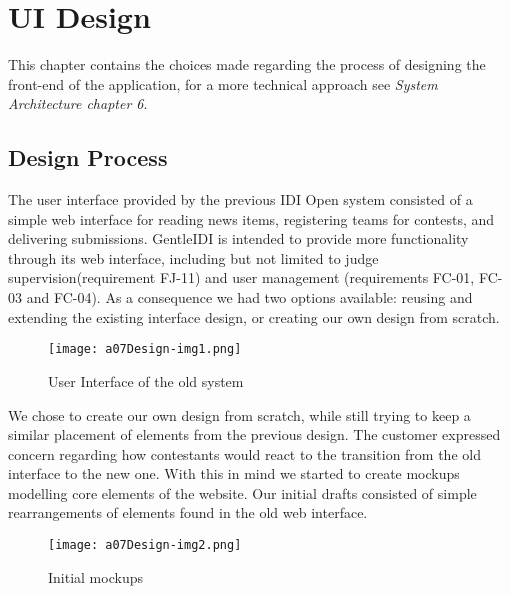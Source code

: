 \chapter{UI Design}
This chapter contains the choices made regarding the process of
designing the front-end of the application, for a more technical
approach see \textit{System Architecture chapter 6}.

\section{Design Process}
\label{sec:designProcess}

The user interface provided by the previous IDI Open system consisted of
a simple web interface for reading news items, registering teams for
contests, and delivering submissions. GentleIDI is intended to provide
more functionality through its web interface, including but not limited
to judge supervision(requirement FJ-11) and user management 
(requirements FC-01, FC-03 and FC-04). As a consequence
we had two options available: reusing and extending the existing
interface design, or creating our own design from scratch.

\begin{figure}[h!]
	\texttt{[image: a07Design-img1.png]} 
	\caption{User Interface of the old system}
	\label{fig:oldSystem}
\end{figure}

We chose to create our own design from scratch, while still trying to
keep a similar placement of elements from the previous design. The
customer expressed concern regarding how contestants would react to the
transition from the old interface to the new one. With this in mind we
started to create mockups modelling core elements of the website. Our
initial drafts consisted of simple rearrangements of elements found in
the old web interface.

\begin{figure}[h!]
	\texttt{[image: a07Design-img2.png]} 
	\caption{Initial mockups}
	\label{fig:mockup}
\end{figure}

